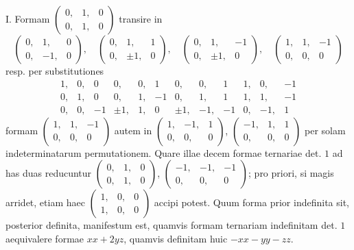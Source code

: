 I. Formam \(\left(\begin{smallmatrix}0,&1,&0\\0,&1,&0\end{smallmatrix}\right)\) transire in
\[
\left(\begin{smallmatrix}0,&1,&0\\0,&-1,&0\end{smallmatrix}\right),\quad
\left(\begin{smallmatrix}0,&1,&1\\0,&\pm1,&0\end{smallmatrix}\right),\quad
\left(\begin{smallmatrix}0,&1,&-1\\0,&\pm1,&0\end{smallmatrix}\right),\quad
\left(\begin{smallmatrix}1,&1,&-1\\0,&0,&0\end{smallmatrix}\right)
\]
resp. per substitutiones
\[
\begin{array}{rrr|rrr|rrr|rrr}
1,&0,&0&0,&0,&1&0,&0,&1&1,&0,&-1\\
0,&1,&0&0,&1,&-1&0,&1,&1&1,&1,&-1\\
0,&0,&-1&\pm1,&1,&0&\pm1,&-1,&-1&0,&-1,&1
\end{array}
\]
formam \(\left(\begin{smallmatrix}1,&1,&-1\\0,&0,&0\end{smallmatrix}\right)\) autem in \(\left(\begin{smallmatrix}1,&-1,&1\\0,&0,&0\end{smallmatrix}\right)\), \(\left(\begin{smallmatrix}-1,&1,&1\\0,&0,&0\end{smallmatrix}\right)\) per solam indeterminatarum permutationem. Quare illae decem formae ternariae det. \(1\) ad has duas reducuntur
\(\left(\begin{smallmatrix}0,&1,&0\\0,&1,&0\end{smallmatrix}\right)\), \(\left(\begin{smallmatrix}-1,&-1,&-1\\0,&0,&0\end{smallmatrix}\right)\); pro priori, si magis arridet, etiam haec \(\left(\begin{smallmatrix}1,&0,&0\\1,&0,&0\end{smallmatrix}\right)\) accipi potest. Quum forma prior indefinita sit, posterior definita, manifestum est, quamvis formam ternariam indefinitam det. \(1\) aequivalere formae \(xx+2yz\), quamvis definitam huic \(-xx-yy-zz\).

